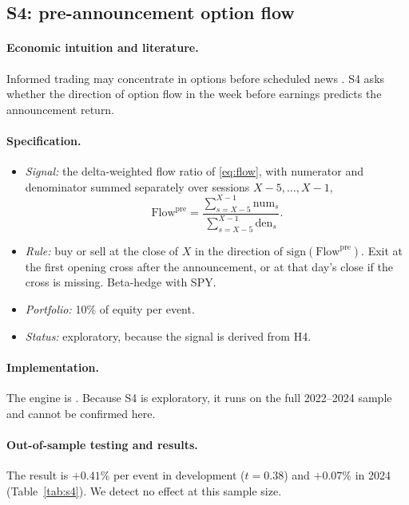 \documentclass[../main.tex]{subfiles}
\begin{document}
\subsection{S4: pre-announcement option flow}\label{sec:s4}

\paragraph{Economic intuition and literature.}
Informed trading may concentrate in options before scheduled news \citep{roll2010,johnsonso2012}. S4 asks whether the direction of option flow in the week before earnings predicts the announcement return.

\paragraph{Specification.}
\begin{itemize}
\item \emph{Signal:} the delta-weighted flow ratio of \eqref{eq:flow}, with numerator and denominator summed separately over sessions $X-5,\dots,X-1$,
\begin{equation}
\mathrm{Flow}^{\mathrm{pre}} = \frac{\sum_{s=X-5}^{X-1} \mathrm{num}_s}{\sum_{s=X-5}^{X-1} \mathrm{den}_s}.
\end{equation}
\item \emph{Rule:} buy or sell at the close of $X$ in the direction of $\mathrm{sign}(\mathrm{Flow}^{\mathrm{pre}})$. Exit at the first opening cross after the announcement, or at that day's close if the cross is missing. Beta-hedge with SPY.
\item \emph{Portfolio:} 10\% of equity per event.
\item \emph{Status:} exploratory, because the signal is derived from H4.
\end{itemize}

\paragraph{Implementation.}
The engine is . Because S4 is exploratory, it runs on the full 2022--2024 sample and cannot be confirmed here.

\paragraph{Out-of-sample testing and results.}
The result is $+0.41\%$ per event in development ($t = 0.38$) and $+0.07\%$ in 2024 (Table~\ref{tab:s4}). We detect no effect at this sample size.
\end{document}
